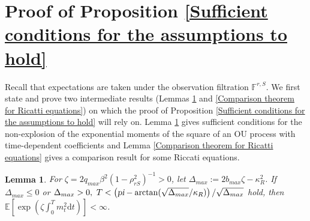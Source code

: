 \documentclass[12,reqno]{amsart}
\numberwithin{equation}{section}
\newtheorem{lemm}[defi]{Lemma}
\begin{document}
\section{Proof of Proposition \ref{Sufficient conditions for the assumptions to hold}}\label{Appendix D}
Recall that expectations are taken under the observation filtration $\mathbb{F}^{r,S}$. We first state and prove two intermediate results (Lemmas \ref{Exponential moment of the square of an OU process} and \ref{Comparison theorem for Ricatti equations}) on which the proof of Proposition \ref{Sufficient conditions for the assumptions to hold} will rely on. Lemma \ref{Exponential moment of the square of an OU process} gives sufficient conditions for the non-explosion of the exponential moments of the square of an OU process with time-dependent coefficients and Lemma \ref{Comparison theorem for Ricatti equations} gives a comparison result for some Riccati equations.
\begin{lemm}\label{Exponential moment of the square of an OU process}
	For $\zeta=2q_{max}\beta^{2}(1-\rho_{rS}^{2})^{-1}>0$, let $\Delta_{max}:=2b_{max}\zeta-\kappa_{R}^{2}$. If $\Delta_{max}\le0$ or $\Delta_{max}>0,~T<\left(\textsl{pi}-\arctan(\sqrt{\Delta_{max}}/\kappa_{R})\right)/\sqrt{\Delta_{max}}$ hold, then $\mathbb{E}\left[\exp\left(\zeta\int_{0}^{T}m_{t}^{2}\mathrm{d}t\right)\right]<\infty$.
\end{lemm}
\end{document}

